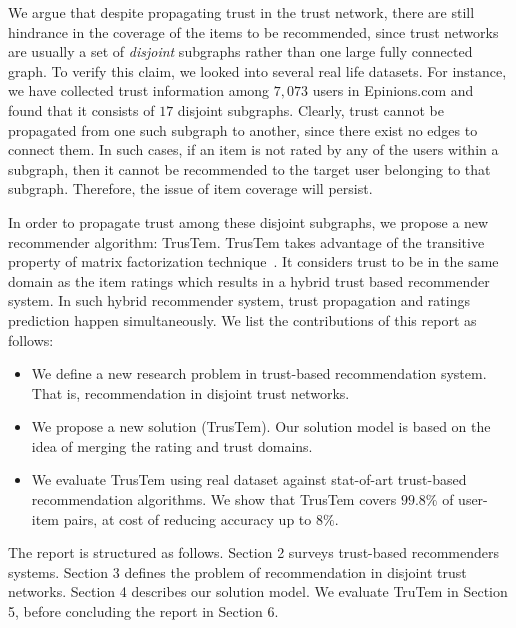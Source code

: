 \documentclass[11pt, conference, onecolumn]{IEEEtran}
\begin{document}
We argue that despite propagating trust in the trust network, there are still hindrance in the coverage of the items to be recommended, since trust networks are usually a set of \textit{disjoint} subgraphs rather than one large fully connected graph. To verify this claim, we looked into several real life datasets. For instance, we have collected trust information among $7,073$ users in Epinions.com and found that it consists of $17$ disjoint subgraphs. Clearly, trust cannot be propagated from one such subgraph to another, since there exist no edges to connect them. In such cases, if an item is not rated by any of the users within a subgraph, then it cannot be recommended to the target user belonging to that subgraph. Therefore, the issue of item coverage will persist.

In order to propagate trust among these disjoint subgraphs, we propose a new recommender algorithm: TrusTem. TrusTem takes advantage of the transitive property of matrix factorization technique~\cite{Koren:2009}. It considers trust to be in the same domain as the item ratings which results in a hybrid trust based recommender system. In such hybrid recommender system, trust propagation and ratings prediction happen simultaneously. We list the contributions of this report as follows:
\begin{itemize}
\item We define a new research problem in trust-based recommendation system. That is, recommendation in disjoint trust networks.
\item We propose a new solution (TrusTem). Our solution model is based on the idea of merging the rating and trust domains.
\item We evaluate TrusTem using real dataset against stat-of-art trust-based recommendation algorithms. We show that TrusTem covers $99.8\%$ of user-item pairs, at cost of reducing accuracy up to $8\%$.
\end{itemize}

The report is structured as follows. Section 2 surveys trust-based recommenders systems. Section 3 defines the problem of recommendation in disjoint trust networks. Section 4 describes our solution model. We evaluate TruTem in Section 5, before concluding the report in Section 6.
\end{document}
